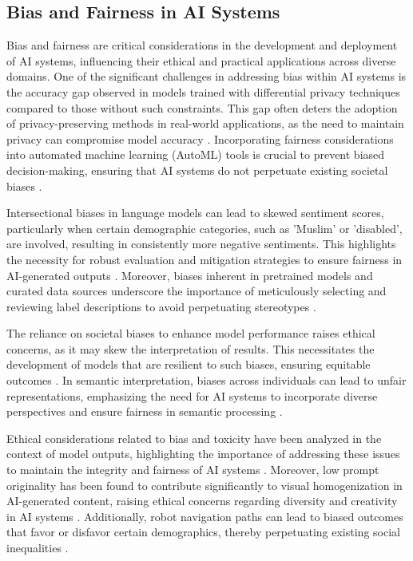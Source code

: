 \subsection{Bias and Fairness in AI Systems} \label{subsec:Bias and Fairness in AI Systems}

Bias and fairness are critical considerations in the development and deployment of AI systems, influencing their ethical and practical applications across diverse domains. One of the significant challenges in addressing bias within AI systems is the accuracy gap observed in models trained with differential privacy techniques compared to those without such constraints. This gap often deters the adoption of privacy-preserving methods in real-world applications, as the need to maintain privacy can compromise model accuracy \cite{ghazi2021deeplearninglabeldifferential}. Incorporating fairness considerations into automated machine learning (AutoML) tools is crucial to prevent biased decision-making, ensuring that AI systems do not perpetuate existing societal biases \cite{narayanan2023democratizecareneedfairness}.



Intersectional biases in language models can lead to skewed sentiment scores, particularly when certain demographic categories, such as 'Muslim' or 'disabled', are involved, resulting in consistently more negative sentiments. This highlights the necessity for robust evaluation and mitigation strategies to ensure fairness in AI-generated outputs \cite{magee2021intersectionalbiascausallanguage}. Moreover, biases inherent in pretrained models and curated data sources underscore the importance of meticulously selecting and reviewing label descriptions to avoid perpetuating stereotypes \cite{gao2023benefitslabeldescriptiontrainingzeroshot}.



The reliance on societal biases to enhance model performance raises ethical concerns, as it may skew the interpretation of results. This necessitates the development of models that are resilient to such biases, ensuring equitable outcomes \cite{nimase2024morecontextshelpsarcasm}. In semantic interpretation, biases across individuals can lead to unfair representations, emphasizing the need for AI systems to incorporate diverse perspectives and ensure fairness in semantic processing \cite{raposo2019lowdimensionalembodiedsemanticsmusic}.



Ethical considerations related to bias and toxicity have been analyzed in the context of model outputs, highlighting the importance of addressing these issues to maintain the integrity and fairness of AI systems \cite{chowdhery2023palm}. Moreover, low prompt originality has been found to contribute significantly to visual homogenization in AI-generated content, raising ethical concerns regarding diversity and creativity in AI systems \cite{palmini2024patternscreativityuserinput}. Additionally, robot navigation paths can lead to biased outcomes that favor or disfavor certain demographics, thereby perpetuating existing social inequalities \cite{brandao2020fairnavigationplanninghumanitarian}.



